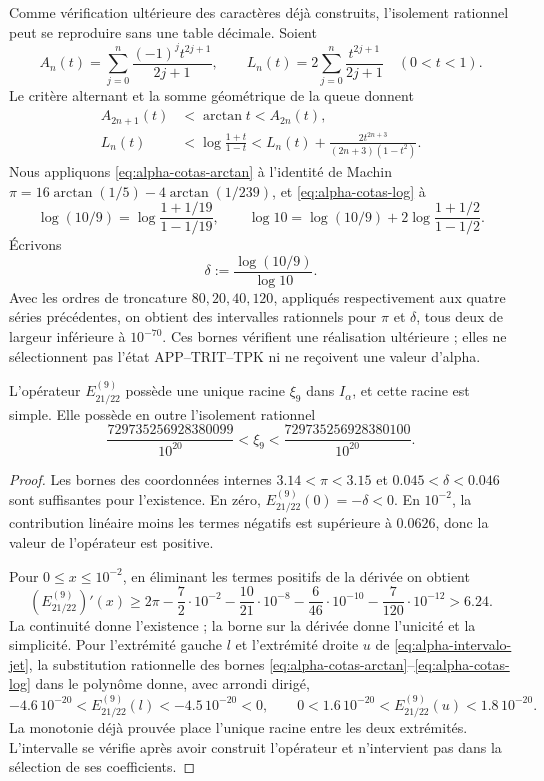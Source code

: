 Comme vérification ultérieure des caractères déjà construits, l'isolement rationnel peut se reproduire sans une table décimale. Soient
\[
 A_n(t)=\sum_{j=0}^{n}\frac{(-1)^jt^{2j+1}}{2j+1},\qquad
 L_n(t)=2\sum_{j=0}^{n}\frac{t^{2j+1}}{2j+1}\quad(0<t<1).
\]
Le critère alternant et la somme géométrique de la queue donnent
\begin{align}
 A_{2n+1}(t)&<\arctan t<A_{2n}(t),
 \label{eq:alpha-cotas-arctan}\\
 L_n(t)&<\log\frac{1+t}{1-t}
 <L_n(t)+\frac{2t^{2n+3}}{(2n+3)(1-t^2)}.
 \label{eq:alpha-cotas-log}
\end{align}
Nous appliquons \eqref{eq:alpha-cotas-arctan} à l'identité de Machin
\(\pi=16\arctan(1/5)-4\arctan(1/239)\), et
\eqref{eq:alpha-cotas-log} à
\[
 \log(10/9)=\log\frac{1+1/19}{1-1/19},\qquad
 \log 10=\log(10/9)+2\log\frac{1+1/2}{1-1/2}.
\]
Écrivons
\[
 \delta:=\frac{\log(10/9)}{\log 10}.
\]
Avec les ordres de troncature \(80,20,40,120\), appliqués
respectivement aux quatre séries précédentes, on obtient des intervalles
rationnels pour \(\pi\) et \(\delta\), tous deux de largeur inférieure à
\(10^{-70}\). Ces bornes vérifient une réalisation ultérieure ; elles ne
sélectionnent pas l'état APP--TRIT--TPK ni ne reçoivent une valeur d'alpha.

\begin{proposition}
\label{prop:alpha-raiz-jet}
L'opérateur \(E_{21/22}^{(9)}\) possède une unique racine
\(\xi_9\) dans \(I_\alpha\), et cette racine est simple. Elle possède en outre l'isolement rationnel
\begin{equation}
 \frac{729735256928380099}{10^{20}}
 <\xi_9<\frac{729735256928380100}{10^{20}}.
 \label{eq:alpha-intervalo-jet}
\end{equation}
\end{proposition}

\begin{proof}
Les bornes des coordonnées internes
\(3.14<\pi<3.15\) et
\(0.045<\delta<0.046\) sont suffisantes pour l'existence. En zéro,
\(E_{21/22}^{(9)}(0)=-\delta<0\). En \(10^{-2}\), la contribution
linéaire moins les termes négatifs est supérieure à \(0.0626\), donc la
valeur de l'opérateur est positive.

Pour \(0\leq x\leq10^{-2}\), en éliminant les termes positifs de
la dérivée on obtient
\[
 (E_{21/22}^{(9)})'(x)
 \geq2\pi-\frac72\cdot10^{-2}
 -\frac{10}{21}\cdot10^{-8}-\frac6{46}\cdot10^{-10}
 -\frac7{120}\cdot10^{-12}>6.24.
\]
La continuité donne l'existence ; la borne sur la dérivée donne l'unicité et la simplicité. Pour l'extrémité gauche \(l\) et l'extrémité droite \(u\) de \eqref{eq:alpha-intervalo-jet}, la substitution rationnelle des bornes \eqref{eq:alpha-cotas-arctan}--\eqref{eq:alpha-cotas-log} dans le polynôme donne, avec arrondi dirigé,
\[
 -4.6\,10^{-20}<E_{21/22}^{(9)}(l)<-4.5\,10^{-20}<0,
 \qquad
 0<1.6\,10^{-20}<E_{21/22}^{(9)}(u)<1.8\,10^{-20}.
\]
La monotonie déjà prouvée place l'unique racine entre les deux extrémités.
L'intervalle se vérifie après avoir construit l'opérateur et n'intervient pas dans la sélection de ses coefficients.
\end{proof}


